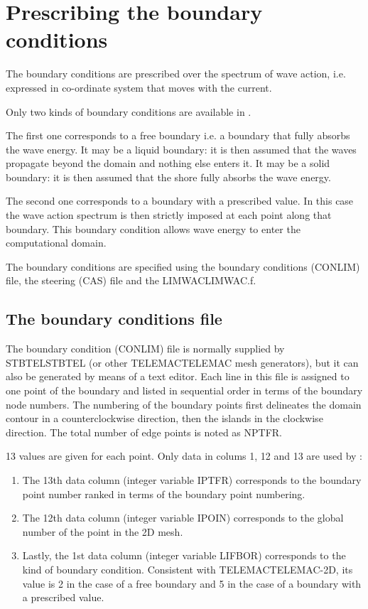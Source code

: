 \section{  Prescribing the boundary conditions}

 The boundary conditions are prescribed over the  spectrum of wave action, i.e. expressed in co-ordinate system that moves with the current.

 Only two kinds of boundary conditions are available in \tomawac.

 The first one corresponds to a free boundary i.e. a boundary that fully absorbs the wave energy. It may be a liquid boundary: it is then assumed that the waves propagate beyond the domain and nothing else enters it. It may be a solid boundary: it is then assumed that the shore fully absorbs the wave energy.

 The second one corresponds to a boundary with a prescribed value. In this case the wave action spectrum is then strictly imposed at each point along that boundary. This boundary condition allows wave energy to enter the computational domain.

 The boundary conditions are specified using the boundary conditions (CONLIM) file, the steering (CAS) file and the LIMWACLIMWAC.f.


\subsection{ The boundary conditions file}

 The boundary condition (CONLIM) file is normally supplied by STBTELSTBTEL (or other TELEMACTELEMAC mesh generators), but it can also be generated by means of a text editor. Each line in this file is assigned to one point of the boundary and listed in sequential order in terms of the boundary node numbers. The numbering of the boundary points first delineates the domain contour in a counterclockwise direction, then the islands in the clockwise direction. The total number of edge points is noted as NPTFR.

 13 values are given for each point. Only data in colums 1, 12 and 13 are used by \tomawac:

\begin{enumerate}
\item  The 13th data column (integer variable IPTFR) corresponds to the boundary point number ranked in terms of the boundary point numbering.

\item  The 12th data column (integer variable IPOIN) corresponds to the global number of the point in the 2D mesh.

\item  Lastly, the 1st data column (integer variable LIFBOR) corresponds to the kind of boundary condition. Consistent with TELEMACTELEMAC-2D, its value is 2 in the case of a free boundary and 5 in the case of a boundary with a prescribed value.
\end{enumerate}


